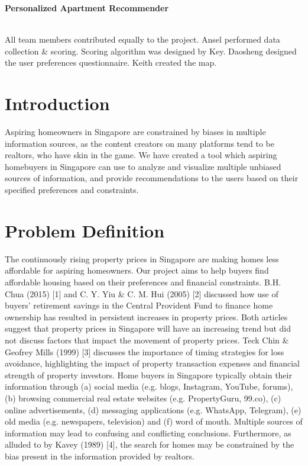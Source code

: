 \documentclass[a4paper, 11pt]{article}
\begin{document}
	\begin{center}
		\sc\large\textbf{Personalized Apartment Recommender}\\
			\\
        	
	\end{center}
	
	
All team members contributed equally to the project.  Ansel performed data collection \& scoring. Scoring algorithm was designed by Key. Daosheng designed the user preferences questionnaire. Keith created the map.

	\section{Introduction}
	
	Aspiring homeowners in Singapore are constrained by biases in multiple information sources, as the content creators on many platforms tend to be realtors, who have skin in the game. We have created a tool which aspiring homebuyers in Singapore can use to analyze and visualize multiple unbiased sources of information, and provide recommendations to the users based on their specified preferences and constraints. 

	\section{Problem Definition}
	
	The continuously rising property prices in Singapore are making homes less affordable for aspiring homeowners. Our project aims to help buyers find affordable housing based on their preferences and financial constraints. B.H. Chua (2015) [1] and C. Y. Yiu \& C. M. Hui (2005) [2] discussed how use of buyers’ retirement savings in the Central Provident Fund to finance home ownership has resulted in persistent increases in property prices. Both articles suggest that property prices in Singapore will have an increasing trend but did not discuss factors that impact the movement of property prices. Teck Chin \& Geofrey Mills (1999) [3] discusses the importance of timing strategies for loss avoidance, highlighting the impact of property transaction expenses and financial strength of property investors. Home buyers in Singapore typically obtain their information through (a) social media (e.g. blogs, Instagram, YouTube, forums), (b) browsing commercial real estate websites (e.g. PropertyGuru, 99.co), (c) online advertisements, (d) messaging applications (e.g. WhatsApp, Telegram), (e) old media (e.g. newspapers, television) and (f) word of mouth. Multiple sources of information may lead to confusing and conflicting conclusions. Furthermore, as alluded to by Kavey (1989) [4], the search for homes may be constrained by the bias present in the information provided by realtors.
\end{document}
